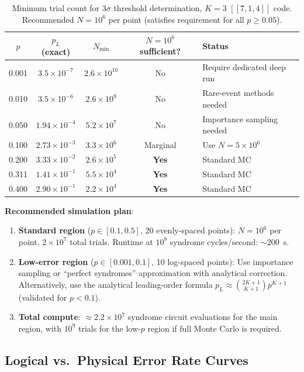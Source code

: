 \documentclass[11pt]{article}
\theoremstyle{definition}
\theoremstyle{remark}
\begin{document}
\begin{table}[h]
\centering
\caption{Minimum trial count for $3\sigma$ threshold determination,
  $K=3$ $[[7,1,4]]$ code.  Recommended $N = 10^6$ per point (satisfies
  requirement for all $p \geq 0.05$).}
\label{tab:trial-counts}
\begin{tabular}{@{}ccccl@{}}
\toprule
$p$ & $p_L$ (exact) & $N_{\min}$ & $N = 10^6$ sufficient? & Status \\
\midrule
0.001 & $3.5\times10^{-7}$ & $2.6\times10^{10}$ & No & Require dedicated deep run \\
0.010 & $3.5\times10^{-6}$ & $2.6\times10^{9}$ & No & Rare-event methods needed \\
0.050 & $1.94\times10^{-4}$ & $5.2\times10^{7}$ & No & Importance sampling needed \\
0.100 & $2.73\times10^{-3}$ & $3.3\times10^{6}$ & Marginal & Use $N=5\times10^6$ \\
0.200 & $3.33\times10^{-2}$ & $2.6\times10^{5}$ & \textbf{Yes} & Standard MC \\
0.311 & $1.41\times10^{-1}$ & $5.5\times10^{4}$ & \textbf{Yes} & Standard MC \\
0.400 & $2.90\times10^{-1}$ & $2.2\times10^{4}$ & \textbf{Yes} & Standard MC \\
\bottomrule
\end{tabular}
\end{table}

\textbf{Recommended simulation plan}:
\begin{enumerate}
  \item \textbf{Standard region} ($p \in [0.1, 0.5]$, 20 evenly-spaced points):
    $N = 10^6$ per point, $2\times10^7$ total trials.  Runtime at $10^8$
    syndrome cycles/second: $\sim200$~s.
  \item \textbf{Low-error region} ($p \in [0.001, 0.1]$, 10 log-spaced points):
    Use importance sampling or ``perfect syndromes'' approximation with
    analytical correction.  Alternatively, use the analytical leading-order
    formula $p_L \approx \binom{2K+1}{K+1}p^{K+1}$ (validated for $p < 0.1$).
  \item \textbf{Total compute}: $\approx 2.2\times10^7$ syndrome circuit
    evaluations for the main region, with $10^9$ trials for the low-$p$ region
    if full Monte Carlo is required.
\end{enumerate}

\subsection{Logical vs.\ Physical Error Rate Curves}
\label{sec:error-curves}
\end{document}

